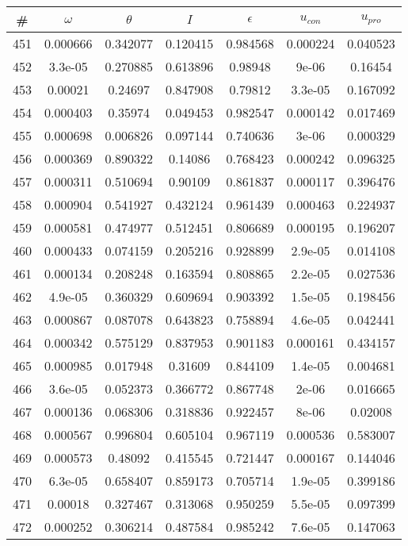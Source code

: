 \newpage
\begin{table}
\begin{tabular}{c|c|c|c|c|c|c}
\# & $\omega$ & $\theta$ & $I$ & $\epsilon$ & $u_{con}$ & $u_{pro}$\\
\hline
451 & 0.000666 & 0.342077 & 0.120415 & 0.984568 & 0.000224 & 0.040523\\
452 & 3.3e-05 & 0.270885 & 0.613896 & 0.98948 & 9e-06 & 0.16454\\
453 & 0.00021 & 0.24697 & 0.847908 & 0.79812 & 3.3e-05 & 0.167092\\
454 & 0.000403 & 0.35974 & 0.049453 & 0.982547 & 0.000142 & 0.017469\\
455 & 0.000698 & 0.006826 & 0.097144 & 0.740636 & 3e-06 & 0.000329\\
456 & 0.000369 & 0.890322 & 0.14086 & 0.768423 & 0.000242 & 0.096325\\
457 & 0.000311 & 0.510694 & 0.90109 & 0.861837 & 0.000117 & 0.396476\\
458 & 0.000904 & 0.541927 & 0.432124 & 0.961439 & 0.000463 & 0.224937\\
459 & 0.000581 & 0.474977 & 0.512451 & 0.806689 & 0.000195 & 0.196207\\
460 & 0.000433 & 0.074159 & 0.205216 & 0.928899 & 2.9e-05 & 0.014108\\
461 & 0.000134 & 0.208248 & 0.163594 & 0.808865 & 2.2e-05 & 0.027536\\
462 & 4.9e-05 & 0.360329 & 0.609694 & 0.903392 & 1.5e-05 & 0.198456\\
463 & 0.000867 & 0.087078 & 0.643823 & 0.758894 & 4.6e-05 & 0.042441\\
464 & 0.000342 & 0.575129 & 0.837953 & 0.901183 & 0.000161 & 0.434157\\
465 & 0.000985 & 0.017948 & 0.31609 & 0.844109 & 1.4e-05 & 0.004681\\
466 & 3.6e-05 & 0.052373 & 0.366772 & 0.867748 & 2e-06 & 0.016665\\
467 & 0.000136 & 0.068306 & 0.318836 & 0.922457 & 8e-06 & 0.02008\\
468 & 0.000567 & 0.996804 & 0.605104 & 0.967119 & 0.000536 & 0.583007\\
469 & 0.000573 & 0.48092 & 0.415545 & 0.721447 & 0.000167 & 0.144046\\
470 & 6.3e-05 & 0.658407 & 0.859173 & 0.705714 & 1.9e-05 & 0.399186\\
471 & 0.00018 & 0.327467 & 0.313068 & 0.950259 & 5.5e-05 & 0.097399\\
472 & 0.000252 & 0.306214 & 0.487584 & 0.985242 & 7.6e-05 & 0.147063\\

\end{tabular}
\end{table}
